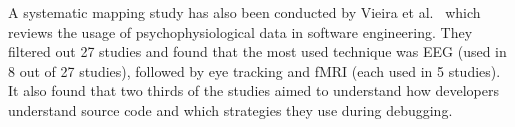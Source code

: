     A systematic mapping study has also been conducted by Vieira et al.~\cite{vieira_usage_2021} which reviews the usage of psychophysiological data in software engineering. They filtered out 27 studies and found that the most used technique was EEG (used in 8 out of 27 studies), followed by eye tracking and fMRI (each used in 5 studies). It also found that two thirds of the studies aimed to understand how developers understand source code and which strategies they use during debugging.
